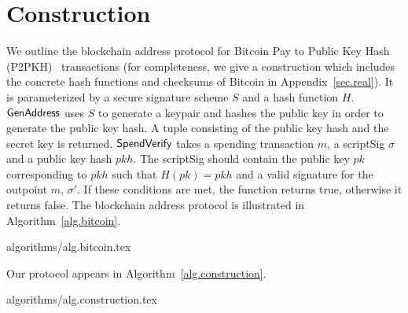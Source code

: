 \section{Construction}\label{section:construction}

We outline the blockchain address protocol for Bitcoin Pay to Public Key Hash (P2PKH)~\cite{bitcoin-dev-guide} transactions (for completeness, we give a construction which includes the concrete hash functions and checksums of Bitcoin in Appendix~\ref{sec.real}). It is parameterized by a secure signature scheme $S$ and a hash function $H$.
$\mathsf{GenAddress}$ uses $S$ to generate a keypair and hashes the public key in order to generate the public key hash. A tuple consisting of the public key hash and the secret key is returned.
$\mathsf{SpendVerify}$ takes a spending transaction $m$, a scriptSig $\sigma$ and a public key hash $pkh$. The scriptSig should contain the public key $pk$ corresponding to $pkh$ such that $H(pk) = pkh$ and a valid signature for the outpoint $m$, $\sigma'$. If these conditions are met, the function returns true, otherwise it returns false.
The blockchain address protocol is illustrated in Algorithm~\ref{alg.bitcoin}.

{algorithms/alg.bitcoin.tex}

Our protocol appears in Algorithm~\ref{alg.construction}.

{algorithms/alg.construction.tex}
